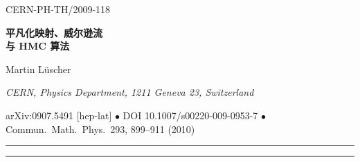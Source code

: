 \documentclass[11pt]{ctexart}
\numberwithin{equation}{section}
\begin{document}
\hfill CERN-PH-TH/2009-118

\vspace{1.5cm}
\begin{center}
  {\Large\bfseries 平凡化映射、威尔逊流\\[0.3cm]
  与 HMC 算法\par}
  \vspace{0.6cm}
 {\large Martin L\"uscher\par}
  \vspace{0.8em}
  {\itshape CERN, Physics Department, 1211 Geneva 23, Switzerland\par}
\end{center}

\vspace{0.4cm}
\begin{flushleft}\small
arXiv:0907.5491 [hep-lat] \quad$\bullet$\quad
DOI 10.1007/s00220-009-0953-7 \quad$\bullet$\quad
Commun.\ Math.\ Phys.\ 293, 899--911 (2010)
\end{flushleft}

\vspace{0.6cm}
\noindent\rule{\textwidth}{0.4pt}
\begin{abstract}
\noindent
在格点规范理论中，存在一类场变换，能把该理论映射到基本场变量完全彼此退耦的平凡理论。
这类映射可以通过对场空间中某些流方程作积分而系统地构造出来。
本文较为细致地给出了这一构造，并建议将威尔逊流
（它为 Wilson 规范作用量生成近似的平凡化映射）
与 HMC 模拟算法结合起来，
以提高格点 QCD 模拟的效率。
\end{abstract}
\noindent\rule{\textwidth}{0.4pt}









\end{document}

